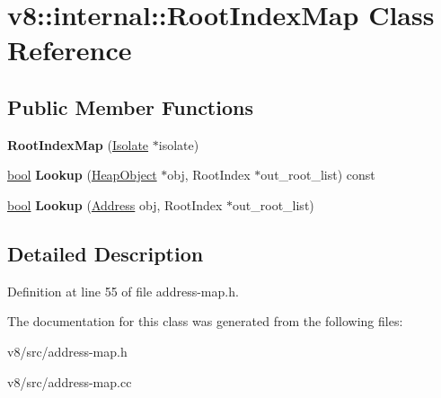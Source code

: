 \hypertarget{classv8_1_1internal_1_1RootIndexMap}{}\section{v8\+:\+:internal\+:\+:Root\+Index\+Map Class Reference}
\label{classv8_1_1internal_1_1RootIndexMap}
\subsection*{Public Member Functions}
\begin{DoxyCompactItemize}
\item 
\mbox{\label{classv8_1_1internal_1_1RootIndexMap_a9536a6e36f64916b6af65519b9a5a34c}} 
{\bfseries Root\+Index\+Map} (\mbox{\hyperlink{classv8_1_1internal_1_1Isolate}{Isolate}} $\ast$isolate)
\item 
\mbox{\label{classv8_1_1internal_1_1RootIndexMap_a93d36d38ddf9cf18203f0c347d72bfa3}} 
\mbox{\hyperlink{classbool}{bool}} {\bfseries Lookup} (\mbox{\hyperlink{classv8_1_1internal_1_1HeapObject}{Heap\+Object}} $\ast$obj, Root\+Index $\ast$out\+\_\+root\+\_\+list) const
\item 
\mbox{\label{classv8_1_1internal_1_1RootIndexMap_a13c061306c7beea93b8e7a7c5ad3757f}} 
\mbox{\hyperlink{classbool}{bool}} {\bfseries Lookup} (\mbox{\hyperlink{classuintptr__t}{Address}} obj, Root\+Index $\ast$out\+\_\+root\+\_\+list)
\end{DoxyCompactItemize}


\subsection{Detailed Description}


Definition at line 55 of file address-\/map.\+h.



The documentation for this class was generated from the following files\+:\begin{DoxyCompactItemize}
\item 
v8/src/address-\/map.\+h\item 
v8/src/address-\/map.\+cc\end{DoxyCompactItemize}
